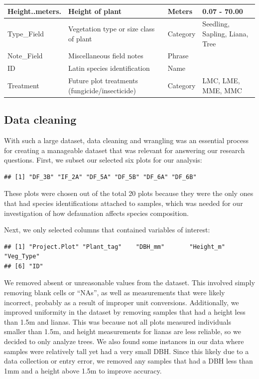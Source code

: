 \documentclass[
  12pt,
]{article}
\begin{document}
\begin{table}
{\begin{tabular}[t]{l|l|l|l}
\hline
Height..meters. & Height of plant & Meters & 0.07 - 70.00\\
\hline
Type\_Field & Vegetation type or size class of plant & Category & Seedling, Sapling, Liana, Tree\\
\hline
Note\_Field & Miscellaneous field notes & Phrase & \\
\hline
ID & Latin species identification & Name & \\
\hline
Treatment & Future plot treatments (fungicide/insecticide) & Category & LMC, LME, MME, MMC\\
\hline
\end{tabular}}
\end{table}

\hypertarget{data-cleaning}{%
\subsection{Data cleaning}\label{data-cleaning}}

With such a large dataset, data cleaning and wrangling was an essential
process for creating a manageable dataset that was relevant for
answering our research questions. First, we subset our selected six
plots for our analysis:

\begin{verbatim}
## [1] "DF_3B" "IF_2A" "DF_5A" "DF_5B" "DF_6A" "DF_6B"
\end{verbatim}

These plots were chosen out of the total 20 plots because they were the
only ones that had species identifications attached to samples, which
was needed for our investigation of how defaunation affects species
composition.

Next, we only selected columns that contained variables of interest:

\begin{verbatim}
## [1] "Project.Plot" "Plant_tag"    "DBH_mm"       "Height_m"     "Veg_Type"    
## [6] "ID"
\end{verbatim}

We removed absent or unreasonable values from the dataset. This involved
simply removing blank cells or ``NAs'', as well as measurements that
were likely incorrect, probably as a result of improper unit
conversions. Additionally, we improved uniformity in the dataset by
removing samples that had a height less than 1.5m and lianas. This was
because not all plots measured individuals smaller than 1.5m, and height
measurements for lianas are less reliable, so we decided to only analyze
trees. We also found some instances in our data where samples were
relatively tall yet had a very small DBH. Since this likely due to a
data collection or entry error, we removed any samples that had a DBH
less than 1mm and a height above 1.5m to improve accuracy.
\end{document}
